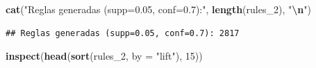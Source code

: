 \documentclass[
]{article}
\newenvironment{Shaded}{\begin{snugshade}}{\end{snugshade}}
\newcommand{\AttributeTok}[1]{\textcolor[rgb]{0.13,0.29,0.53}{#1}}
\newcommand{\DecValTok}[1]{\textcolor[rgb]{0.00,0.00,0.81}{#1}}
\newcommand{\FunctionTok}[1]{\textcolor[rgb]{0.13,0.29,0.53}{\textbf{#1}}}
\newcommand{\NormalTok}[1]{#1}
\newcommand{\SpecialCharTok}[1]{\textcolor[rgb]{0.81,0.36,0.00}{\textbf{#1}}}
\newcommand{\StringTok}[1]{\textcolor[rgb]{0.31,0.60,0.02}{#1}}
\begin{document}
\begin{Shaded}
\begin{Highlighting}[]
\FunctionTok{cat}\NormalTok{(}\StringTok{"Reglas generadas (supp=0.05, conf=0.7):"}\NormalTok{, }\FunctionTok{length}\NormalTok{(rules\_2), }\StringTok{"}\SpecialCharTok{\textbackslash{}n}\StringTok{"}\NormalTok{)}
\end{Highlighting}
\end{Shaded}

\begin{verbatim}
## Reglas generadas (supp=0.05, conf=0.7): 2817
\end{verbatim}

\begin{Shaded}
\begin{Highlighting}[]
\FunctionTok{inspect}\NormalTok{(}\FunctionTok{head}\NormalTok{(}\FunctionTok{sort}\NormalTok{(rules\_2, }\AttributeTok{by =} \StringTok{"lift"}\NormalTok{), }\DecValTok{15}\NormalTok{))}
\end{Highlighting}
\end{Shaded}
\end{document}
